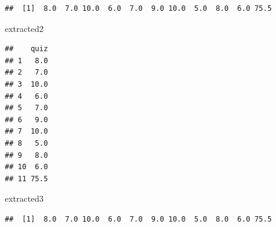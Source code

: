 \documentclass[
]{article}
\newenvironment{Shaded}{\begin{snugshade}}{\end{snugshade}}
\newcommand{\NormalTok}[1]{#1}
\begin{document}
\begin{verbatim}
##  [1]  8.0  7.0 10.0  6.0  7.0  9.0 10.0  5.0  8.0  6.0 75.5
\end{verbatim}

\begin{Shaded}
\begin{Highlighting}[]
\NormalTok{extracted2}
\end{Highlighting}
\end{Shaded}

\begin{verbatim}
##    quiz
## 1   8.0
## 2   7.0
## 3  10.0
## 4   6.0
## 5   7.0
## 6   9.0
## 7  10.0
## 8   5.0
## 9   8.0
## 10  6.0
## 11 75.5
\end{verbatim}

\begin{Shaded}
\begin{Highlighting}[]
\NormalTok{extracted3}
\end{Highlighting}
\end{Shaded}

\begin{verbatim}
##  [1]  8.0  7.0 10.0  6.0  7.0  9.0 10.0  5.0  8.0  6.0 75.5
\end{verbatim}
\end{document}

